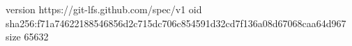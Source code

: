 version https://git-lfs.github.com/spec/v1
oid sha256:f71a74622188546856d2c715dc706c854591d32cd7f136a08d67068caa64d967
size 65632
